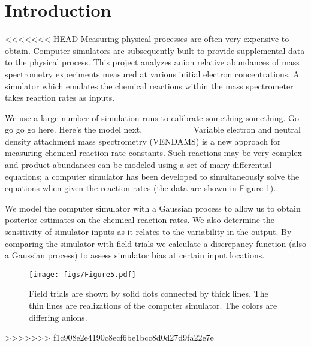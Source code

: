 \section{Introduction}

<<<<<<< HEAD
Measuring physical processes are often very expensive to obtain. Computer simulators are subsequently built to provide supplemental data to the physical process. This project analyzes anion relative abundances of mass spectrometry experiments measured at various initial electron concentrations. A simulator which emulates the chemical reactions within the mass spectrometer takes reaction rates as inputs.

We use a large number of simulation runs to calibrate something something. Go go go go here. Here's the model next.
=======
Variable electron and neutral density attachment mass spectrometry (VENDAMS) is a new approach for measuring chemical reaction rate constants. Such reactions may be very complex and product abundances can be modeled using a set of many differential equations; a computer simulator has been developed to simultaneously solve the equations when given the reaction rates (the data are shown in Figure \ref{data}). 

We model the computer simulator with a Gaussian process to allow us to obtain posterior estimates on the chemical reaction rates. We also determine the sensitivity of simulator inputs as it relates to the variability in the output. By comparing the simulator with field trials we calculate a discrepancy function (also a Gaussian process) to assess simulator bias at certain input locations.

\begin{figure}[H]
\begin{center}
\texttt{[image: figs/Figure5.pdf]}
\end{center}
\caption{Field trials are shown by solid dots connected by thick lines. The thin lines are realizations of the computer simulator. The colors are differing anions.}
\label{data}
\end{figure}
>>>>>>> f1c908e2e4190c8ecf6be1bcc8d0d27d9fa22e7e
